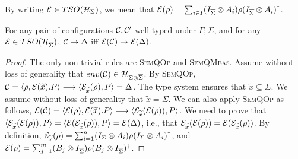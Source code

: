 By writing $\mathcal{E} \in TSO(\mathcal{H}_{\Sigma})$, we mean that $\mathcal{E}(\rho) = \sum_{i \in I} (I_{\overline{\Sigma}} \otimes A_i) \rho (I_{\overline{\Sigma}} \otimes A_i)^{\dagger}$.


\begin{lemma}\label{lemma:sop}
	For any pair of configurations $\mathcal{C}, \mathcal{C}'$ well-typed under $\Gamma; \Sigma$, and for any $\mathcal{E} \in TSO(\mathcal{H}_{\overline{\Sigma}})$,
	$\mathcal{C} \rightarrow \Delta$ iff $\mathcal{E}(\mathcal{C}) \rightarrow \mathcal{E}(\Delta)$.
\end{lemma}
\begin{proof}
	The only non trivial rules are {\scshape SemQOp} and {\scshape SemQMeas}.
	Assume without loss of generality that $env(\mathcal{C}) \in \mathcal{H}_{\Sigma \otimes \overline{\Sigma}}$.
	By {\scshape SemQOp}, $\mathcal{C} = \langle \rho, \mathcal{E}(\widetilde{x}) . P \rangle \longrightarrow \langle \mathcal{E}_{\widetilde{x}}(\rho), P \rangle = \Delta$.
	The type system ensures that $\tilde{x} \subseteq \Sigma$.
	We assume without loss of generality that $\tilde{x} = \Sigma$.
	We can also apply {\scshape SemQOp} as follows, $\mathcal{E}(\mathcal{C}) = \langle \mathcal{E}(\rho), \mathcal{E}(\widetilde{x}) . P \rangle  \longrightarrow \langle \mathcal{E}_{\widetilde{x}}(\mathcal{E}(\rho)), P \rangle$.
	We need to prove that $\langle \mathcal{E}_{\widetilde{x}}(\mathcal{E}(\rho)), P \rangle = \langle \mathcal{E}(\mathcal{E}_{\widetilde{x}}(\rho)), P \rangle = \mathcal{E}(\Delta)$, i.e., that $\mathcal{E}_{\widetilde{x}}(\mathcal{E}(\rho)) = \mathcal{E}(\mathcal{E}_{\widetilde{x}}(\rho))$.
	By definition, $\mathcal{E}_{\widetilde{x}}(\rho) = \sum_{i = 1}^{n} (I_{\Sigma} \otimes A_i) \rho (I_{\Sigma} \otimes A_i)^{\dagger}$, and $\mathcal{E}(\rho) = \sum_{j = 1}^{m} (B_j \otimes I_{\overline{\Sigma}}) \rho (B_j \otimes I_{\overline{\Sigma}})^{\dagger}$.


\end{proof}

